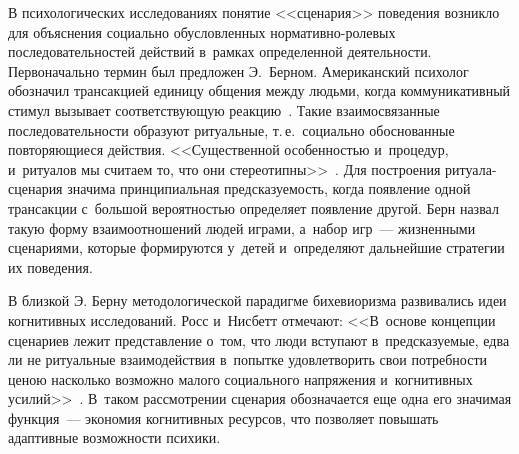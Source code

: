 \begin{multicols}{2}
\vspace*{-1pt}

  В психологических исследованиях понятие <<сценария>> поведения возникло 
для объяснения социально обусловленных нор\-ма\-тив\-но-ро\-ле\-вых 
последовательностей действий в~рамках определенной деятельности. 
Первоначально термин был предложен Э.~Берном. Американский психолог 
обозначил трансакцией единицу общения между людьми, когда 
коммуникативный стимул вызывает соответствующую реакцию~\cite{4-sm}. 
Такие взаимосвязанные последовательности образуют ритуальные, т.\,е.\ 
социально обоснованные повторяющиеся действия. <<Существенной 
особенностью и~процедур, и~ритуалов мы считаем то, что они  
стереотипны>>~\cite[с.~14]{4-sm}. Для построения ри\-ту\-ала-сце\-на\-рия 
значима принципиальная предсказуемость, когда появление одной трансакции 
с~большой вероятностью определяет появление другой. Берн назвал такую 
форму взаимоотношений людей играми, а~набор игр~--- жизненными 
сценариями, которые формируются у~детей и~определяют дальнейшие 
стратегии их поведения. 
  
  В близкой Э. Берну методологической парадигме бихевиоризма развивались 
идеи когнитивных исследований. Росс и~Нисбетт отмечают: <<В~основе 
концепции сценариев лежит представление о~том, что люди вступают 
в~пред\-ска\-зу\-емые, едва ли не ритуальные взаимодействия в~попытке 
удовлетворить свои по\-треб\-но\-сти ценою насколько воз\-мож\-но малого 
социального напряжения и~когнитивных усилий>>~\cite[с.~145]{5-sm}. 
В~таком рассмотрении сценария обозначается еще одна его значимая 
функция~--- экономия когнитивных ресурсов, что позволяет повышать 
адаптивные возможности пси\-хики.
{ %

}
  

\end{multicols}
